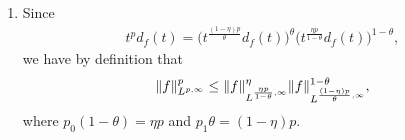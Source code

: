 \begin{enumerate}
\begin{enumerate}
   \item[(b)] Since
   \begin{equation*}\begin{aligned}
   t^{p}d_{f}(t) = \big(t^{\frac{(1-\eta)p}{\theta}}d_{f}(t)\big)^{\theta}
   \big(t^{\frac{\eta p}{1-\theta}}d_{f}(t)\big)^{1-\theta},
   \end{aligned}\end{equation*}
   we have by definition that
   \begin{equation*}\begin{aligned}
   \Vert f \Vert_{L^{p,\infty}}^{p} 
   \leq \Vert f \Vert_{L^{\frac{\eta p}{1-\theta},\infty}}^{\eta}
   \Vert f \Vert_{L^{\frac{(1-\eta)p}{\theta},\infty}}^{1-\theta},
   \end{aligned}\end{equation*}
   where $p_{0}(1-\theta)=\eta p$ and $p_{1}\theta=(1-\eta) p$.
   \end{enumerate}


\end{enumerate}

